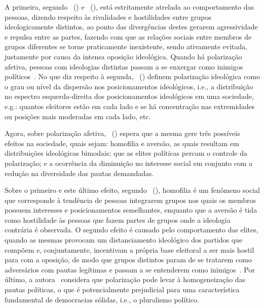 \documentclass[
	12pt,				%
	openright,			%
	twoside,			%
	a4paper,			%
	openany,
	english,			%
	brazil				%
	]{abntex2}
\begin{document}
A primeira, segundo ~(\citeyear{Bednar2021Dec}) e ~(\citeyear{Baldassarri2021Dec}), está estritamente atrelada ao comportamento das pessoas, dizendo respeito às rivalidades e hostilidades entre grupos ideologicamente distintos, ao ponto das divergências destes gerarem agressividade e repulsa entre as partes, fazendo com que as relações sociais entre membros de grupos diferentes se torne praticamente inexistente, sendo ativamente evitada, justamente por causa da intensa oposição ideológica. Quando há polarização afetiva, pessoas com ideologias distintas passam a se enxergar como inimigos políticos~\cite{Bednar2021Dec}. No que diz respeito à segunda, ~(\citeyear{Axelrod2021Dec}) definem polarização ideológica como o grau ou nível da dispersão nos posicionamentos ideológicos, i.e., a distribuição no espectro esquerda-direita dos posicionamentos ideológicos em uma sociedade, e.g.: quantos eleitores estão em cada lado e se há concentração nas extremidades ou posições mais moderadas em cada lado, etc.

Agora, sobre polarização afetiva, ~(\citeyear{Bednar2021Dec}) espera que a mesma gere três possíveis efeitos na sociedade, quais sejam: homofilia e aversão, as quais resultam em distribuições ideológicas bimodais; que as elites políticas percam o controle da polarização; e a ocorrência da diminuição no interesse social em conjunto com a redução na diversidade das pautas demandadas.

Sobre o primeiro e este último efeito, segundo ~(\citeyear{Bednar2021Dec}), homofilia é um fenômeno social que corresponde à tendência de pessoas integrarem grupos nos quais os membros possuem interesses e posicionamentos semelhantes, enquanto que a aversão é tida como hostilidade às pessoas que fazem partes de grupos onde a ideologia contrária é observada. O segundo efeito é causado pelo comportamento das elites, quando as mesmas provocam um distanciamento ideológico dos partidos que compõem e, conjuntamente, incentivam a própria base eleitoral a ser mais hostil para com a oposição, de modo que grupos distintos param de se tratarem como adversários com pautas legítimas e passam a se entenderem como inimigos~\cite{Bednar2021Dec}. Por último, a autora~\cite{Bednar2021Dec} considera que polarização pode levar à homogeneização das pautas políticas, o que é potencialmente prejudicial para uma característica fundamental de democracias sólidas, i.e., o pluralismo político.
\end{document}
